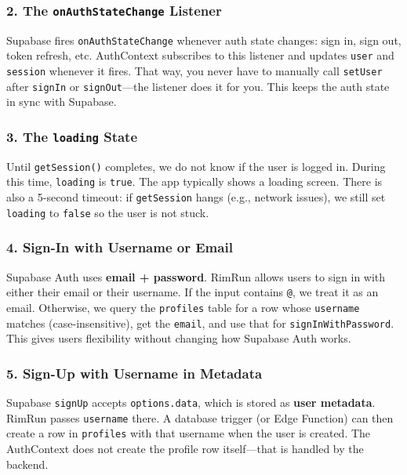 \documentclass[11pt,a4paper]{article}
\begin{document}
\subsubsection{2. The \texttt{onAuthStateChange} Listener}

Supabase fires \texttt{onAuthStateChange} whenever auth state changes: sign in, sign out, token refresh, etc. AuthContext subscribes to this listener and updates \texttt{user} and \texttt{session} whenever it fires. That way, you never have to manually call \texttt{setUser} after \texttt{signIn} or \texttt{signOut}---the listener does it for you. This keeps the auth state in sync with Supabase.

\subsubsection{3. The \texttt{loading} State}

Until \texttt{getSession()} completes, we do not know if the user is logged in. During this time, \texttt{loading} is \texttt{true}. The app typically shows a loading screen. There is also a 5-second timeout: if \texttt{getSession} hangs (e.g., network issues), we still set \texttt{loading} to \texttt{false} so the user is not stuck.

\subsubsection{4. Sign-In with Username or Email}

Supabase Auth uses \textbf{email + password}. RimRun allows users to sign in with either their email or their username. If the input contains \texttt{@}, we treat it as an email. Otherwise, we query the \texttt{profiles} table for a row whose \texttt{username} matches (case-insensitive), get the \texttt{email}, and use that for \texttt{signInWithPassword}. This gives users flexibility without changing how Supabase Auth works.

\subsubsection{5. Sign-Up with Username in Metadata}

Supabase \texttt{signUp} accepts \texttt{options.data}, which is stored as \textbf{user metadata}. RimRun passes \texttt{username} there. A database trigger (or Edge Function) can then create a row in \texttt{profiles} with that username when the user is created. The AuthContext does not create the profile row itself---that is handled by the backend.
\end{document}
